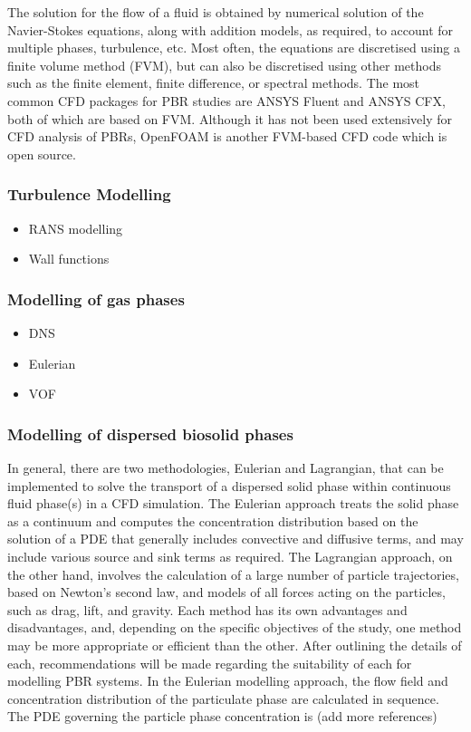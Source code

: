The solution for the flow of a fluid is obtained by numerical solution of the Navier-Stokes equations, along with addition models, as required, to account for multiple phases, turbulence, etc. Most often, the equations are discretised using a finite volume method (FVM), but can also be discretised using other methods such as the finite element, finite difference, or spectral methods.  The most common CFD packages for PBR studies are ANSYS Fluent and ANSYS CFX, both of which are based on FVM.  Although it has not been used extensively for CFD analysis of PBRs, OpenFOAM is another FVM-based CFD code which is open source.

\subsubsection{Turbulence Modelling}

\begin{itemize}
\item RANS modelling
\item Wall functions
\end{itemize}


\subsubsection{Modelling of gas phases}
\begin{itemize}
\item DNS
\item Eulerian
\item VOF
\end{itemize}

\subsubsection{Modelling of dispersed biosolid phases}
\label{S:21}

In general, there are two methodologies, Eulerian and Lagrangian, that can be implemented to solve the transport of a dispersed solid phase within continuous fluid phase(s) in a CFD simulation. The Eulerian approach treats the solid phase as a continuum and computes the concentration distribution based on the solution of a PDE that generally includes convective and diffusive terms, and may include various source and sink terms as required.  The Lagrangian approach, on the other hand, involves the calculation of a large number of particle trajectories, based on Newton's second law, and models of all forces acting on the particles, such as drag, lift, and gravity. Each method has its own advantages and disadvantages, and, depending on the specific objectives of the study, one method may be more appropriate or efficient than the other.  After outlining the details of each, recommendations will be made regarding the suitability of each for modelling PBR systems.
\skippingparagraph
In the Eulerian modelling approach, the flow field and concentration distribution of the particulate phase are calculated in sequence.  The PDE governing the particle phase concentration is \cite{Zhang2007} (add more references)


